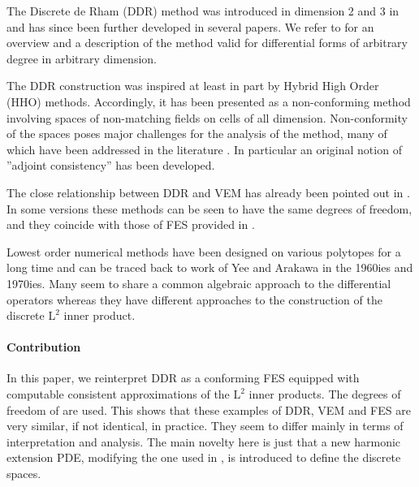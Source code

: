 \documentclass[10pt,a4paper]{article}
\newcommand{\rmL}{\mathrm{L}}
\theoremstyle{remark}
\theoremstyle{definition}
\numberwithin{equation}{section}
\begin{document}
The Discrete de Rham (DDR) method was introduced in dimension 2 and 3 in \cite{DiPDroRap20} and has since been further developed in several papers. We refer to \cite{BonDiPDroHu25} for an overview and a description of the method valid for differential forms of arbitrary degree in arbitrary dimension. 

The DDR construction was inspired at least in part by Hybrid High Order (HHO) methods. Accordingly, it has been presented as a non-conforming method involving spaces of non-matching fields on cells of all dimension. Non-conformity of the spaces poses major challenges for the analysis of the method, many of which have been addressed in the literature \cite{DiPDro23,DiPDroPit23}. In particular an original notion of ''adjoint consistency'' has been developed.

The close relationship between DDR and VEM has already been pointed out in \cite{BeiDasDiPDro22}. In some versions these methods can be seen to have the same degrees of freedom, and they coincide with those of FES provided in \cite[\S 2.1]{ChrGil16}.

Lowest order numerical methods have been designed on various polytopes for a long time and can be traced back to work of Yee and Arakawa in the 1960ies and 1970ies. Many seem to share a common algebraic approach to the differential operators whereas they have different approaches to the construction of the discrete $\rmL^2$ inner product.

\paragraph{Contribution} In this paper, we reinterpret DDR as a conforming FES equip\-ped with computable consistent approximations of the $\rmL^2$ inner products.  The degrees of freedom of \cite[\S 2.1]{ChrGil16} are used.  This shows that these examples of DDR, VEM and FES are very similar, if not identical, in practice. They seem to differ mainly in terms of interpretation and analysis. The main novelty here is just that a new harmonic extension PDE, modifying the one used in \cite[\S 2.1]{ChrGil16}, is introduced to define the discrete spaces.
\end{document}
